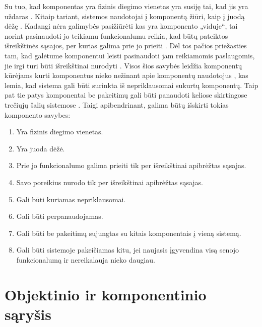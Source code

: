 Su tuo, kad komponentas yra fizinis diegimo vienetas yra susiję
tai, kad jis yra uždaras
\cite[36]{cs-beyond-object-oriented-programming}. Kitaip tariant,
sistemos naudotojai į komponentą žiūri, kaip į juodą
dėžę \cite[2]{Gill:2003:CMF:966221.966237}.
Kadangi nėra galimybės pasižiūrėti kas yra komponento „viduje“,
tai norint pasinaudoti jo teikiamu funkcionalumu reikia, kad būtų
pateiktos išreikštinės sąsajos, per kurias galima prie jo
prieiti
\cites[387]{objects-components-and-frameworks-with-uml}%
[36]{cs-beyond-object-oriented-programming}. Dėl tos
pačios priežasties tam, kad galėtume komponentui leisti pasinaudoti
jam reikiamomis paslaugomis, jie irgi turi būti išreikštinai nurodyti
\cites[387]{objects-components-and-frameworks-with-uml}%
[36]{cs-beyond-object-oriented-programming}. Visos šios
savybės leidžia komponentų kūrėjams kurti komponentus nieko
nežinant apie komponentų naudotojus
\cites[2]{Gill:2003:CMF:966221.966237}%
[139]{meyer1999components},
kas lemia, kad sistema gali būti surinkta iš nepriklausomai sukurtų
komponentų. Taip pat tie patys komponentai be pakeitimų gali būti
panaudoti keliose skirtingose trečiųjų šalių sistemose
\cites[388]{objects-components-and-frameworks-with-uml}%
[36]{cs-beyond-object-oriented-programming}. Taigi
apibendrinant, galima būtų išskirti tokias komponento savybes:
\begin{enumerate}
  \item \label{com:exe:deployment} Yra fizinis diegimo vienetas.
  \item \label{com:exe:blackbox} Yra juoda dėžė.
  \item \label{com:exe:interfaceprovider} Prie jo funkcionalumo galima
    prieiti tik per išreikštinai apibrėžtas sąsajas.
  \item \label{com:exe:interfaceuser} Savo poreikius nurodo tik per
    išreikštinai apibrėžtas sąsajas.
  \item \label{com:exe:independent} Gali būti kuriamas nepriklausomai.
  \item \label{com:exe:reusable} Gali būti perpanaudojamas.
  \item \label{com:exe:composed} Gali būti be pakeitimų sujungtas su
    kitais komponentais į vieną sistemą.
  \item \label{com:exe:interchangable} Gali būti sistemoje
    pakeičiamas kitu, jei naujasis įgyvendina visą senojo
    funkcionalumą ir nereikalauja nieko daugiau.
\end{enumerate}

\section{Objektinio ir komponentinio sąryšis}

